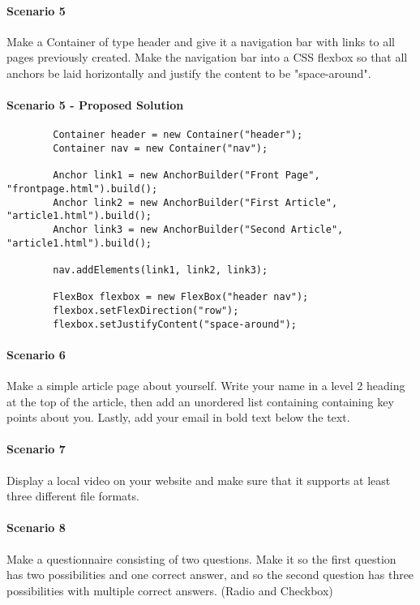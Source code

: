 \documentclass[12pt]{article}
\begin{document}
    \paragraph{Scenario 5}
    Make a Container of type header and give it a navigation bar with links to all pages previously created. Make the navigation bar into a CSS flexbox so that all anchors be laid horizontally and justify the content to be "space-around".

    \paragraph{Scenario 5 - Proposed Solution}

    \begin{lstlisting}
        Container header = new Container("header");
        Container nav = new Container("nav");

        Anchor link1 = new AnchorBuilder("Front Page", "frontpage.html").build();
        Anchor link2 = new AnchorBuilder("First Article", "article1.html").build();
        Anchor link3 = new AnchorBuilder("Second Article", "article1.html").build();

        nav.addElements(link1, link2, link3);

        FlexBox flexbox = new FlexBox("header nav");
        flexbox.setFlexDirection("row");
        flexbox.setJustifyContent("space-around");
    \end{lstlisting}



    \paragraph{Scenario 6}
    Make a simple article page about yourself. Write your name in a level 2 heading at the top of the article, then add an unordered list containing containing key points about you. Lastly, add your email in bold text below the text.

    \paragraph{Scenario 7}
    Display a local video on your website and make sure that it supports at least three different file formats.

    \paragraph{Scenario 8}
    Make a questionnaire consisting of two questions. Make it so the first question has two possibilities and one correct answer, and so the second question has three possibilities with multiple correct answers. (Radio and Checkbox)
\end{document}
